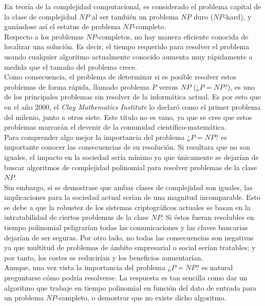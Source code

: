 En teoría de la complejidad computacional, es considerado el problema capital de la clase de complejidad $NP$ al ser también un problema $NP$ duro ($NP$-hard), y ganándose así el estatus de problema $NP$-completo. \\

Respecto a los problemas $NP$-completos, no hay manera eficiente conocida de localizar una solución. Es decir, el tiempo requerido para resolver el problema usando cualquier algoritmo actualmente conocido aumenta muy rápidamente a medida que el tamaño del problema crece.\\

Como consecuencia, el problema de determinar si es posible resolver estos problemas de forma rápida, llamado problema $P$ versus $NP$ (¿$P=NP$?), es uno de los principales problemas sin resolver de la informática actual. Es por esto que en el año 2000, el \textit{Clay Mathematics Institute} lo declaró como el primer problema del milenio, junto a otros siete. Este título no es vano, ya que se cree que estos problemas marcarán el devenir de la comunidad científico-matemática.\\

Para comprender algo mejor la importancia del problema ¿$P=NP$? es importante conocer las consecuencias de su resolución. Si resultara que no son iguales, el impacto en la sociedad sería mínimo ya que únicamente se dejarían de buscar algoritmos de complejidad polinomial para resolver problemas de la clase $NP$.\\

Sin embargo, si se demostrase que ambas clases de complejidad son iguales, las implicaciones para la sociedad actual serían de una magnitud incomparable. Esto se debe a que la robustez de los sistemas criptográficos actuales se basan en la intratabilidad de ciertos problemas de la clase $NP$. Si éstos fueran resolubles en tiempo polinomial peligrarían todas las comunicaciones y las claves bancarias dejarían de ser seguras. Por otro lado, no todas las consecuencias son negativas ya que multitud de problemas de ámbito empresarial o social serían tratables; y por tanto, los costes se reducirían y los beneficios aumentarían.\\

Aunque, una vez vista la importancia del problema ¿$P=NP$? es natural preguntarse cómo podría resolverse. La respuesta es tan sencilla como dar un algoritmo que trabaje en tiempo polinomial en función del dato de entrada para un problema $NP$-completo, o demostrar que no existe dicho algoritmo. \\ 

